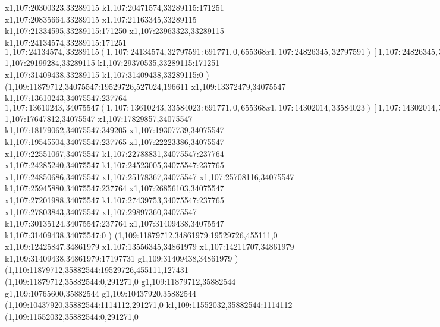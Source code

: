 {x1,107:20300323,33289115
k1,107:20471574,33289115:171251
x1,107:20835664,33289115
x1,107:21163345,33289115
k1,107:21334595,33289115:171250
x1,107:23963323,33289115
k1,107:24134574,33289115:171251
$1,107:24134574,33289115
(1,107:24134574,32797591:691771,0,655368
x1,107:24826345,32797591
)
[1,107:24826345,33485726:1020289,723635,0
(1,107:24826345,32959609:555237,197518,0
x1,107:25348814,32959609
)
(1,107:24826345,33485726:1020289,295640,0
x1,107:25813866,33485726
)
]
k1,107:25955858,33289115:109224
x1,107:26221871,33289115
(1,107:26221871,33387418:356734,197518,0
x1,107:26545837,33387418
)
x1,107:27131338,33289115
(1,107:27131338,33387418:356734,197518,0
x1,107:27455304,33387418
)
x1,107:27670117,33289115
k1,107:27852157,33289115:182040
x1,107:28361883,33289115
k1,107:28543923,33289115:182040
x1,107:29199284,33289115
$1,107:29199284,33289115
k1,107:29370535,33289115:171251
x1,107:31409438,33289115
k1,107:31409438,33289115:0
)
(1,109:11879712,34075547:19529726,527024,196611
x1,109:13372479,34075547
k1,107:13610243,34075547:237764
$1,107:13610243,34075547
(1,107:13610243,33584023:691771,0,655368
x1,107:14302014,33584023
)
[1,107:14302014,34272158:1020289,723635,0
(1,107:14302014,33746041:555237,197518,0
x1,107:14824483,33746041
)
(1,107:14302014,34272158:1020289,295640,0
x1,107:15289535,34272158
)
]
k1,107:15431527,34075547:109224
x1,107:15697540,34075547
(1,107:15697540,34173850:356734,197518,0
x1,107:16021506,34173850
)
k1,107:16268500,34075547:214226
x1,107:16778226,34075547
k1,107:16992451,34075547:214225
x1,107:17647812,34075547
$1,107:17647812,34075547
x1,107:17829857,34075547
k1,107:18179062,34075547:349205
x1,107:19307739,34075547
k1,107:19545504,34075547:237765
x1,107:22223386,34075547
x1,107:22551067,34075547
k1,107:22788831,34075547:237764
x1,107:24285240,34075547
k1,107:24523005,34075547:237765
x1,107:24850686,34075547
x1,107:25178367,34075547
x1,107:25708116,34075547
k1,107:25945880,34075547:237764
x1,107:26856103,34075547
x1,107:27201988,34075547
k1,107:27439753,34075547:237765
x1,107:27803843,34075547
x1,107:29897360,34075547
k1,107:30135124,34075547:237764
x1,107:31409438,34075547
k1,107:31409438,34075547:0
)
(1,109:11879712,34861979:19529726,455111,0
x1,109:12425847,34861979
x1,107:13556345,34861979
x1,107:14211707,34861979
k1,109:31409438,34861979:17197731
g1,109:31409438,34861979
)
(1,110:11879712,35882544:19529726,455111,127431
(1,109:11879712,35882544:0,291271,0
g1,109:11879712,35882544
g1,109:10765600,35882544
g1,109:10437920,35882544
(1,109:10437920,35882544:1114112,291271,0
k1,109:11552032,35882544:1114112
(1,109:11552032,35882544:0,291271,0
}

